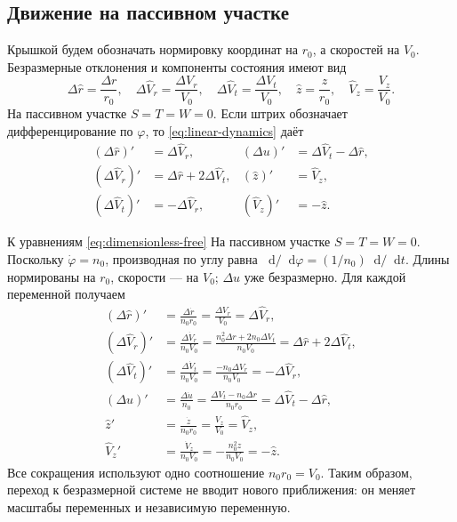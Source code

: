 \documentclass[a4paper,11pt]{article}
\newcommand{\dd}{\mathop{}\!\mathrm d}
\numberwithin{equation}{section}
\theoremstyle{remark}
\begin{document}
\subsection{Движение на пассивном участке}

Крышкой будем обозначать нормировку координат на $r_0$, а скоростей
на $V_0$. Безразмерные отклонения и компоненты состояния имеют вид
\begin {equation}
 \Delta\widehat r=\frac{{\Delta r}}{{r_0}},\quad
 \Delta\widehat V_r=\frac{{\Delta V_r}}{{V_0}},\quad
 \Delta\widehat V_t=\frac{{\Delta V_t}}{{V_0}},\quad
 \widehat z=\frac{{z}}{{r_0}},\quad
 \widehat V_z=\frac{{V_z}}{{V_0}}.
 \label {eq:dimensionless-state}
\end {equation}
На пассивном участке $S=T=W=0$. Если штрих обозначает
дифференцирование по $\varphi$, то \eqref{eq:linear-dynamics} даёт
\begin{equation}
 \begin{aligned}
  (\Delta\widehat r)'&=\Delta\widehat V_r,&
  (\Delta u)'&=\Delta\widehat V_t-\Delta\widehat r,\\
  (\Delta\widehat V_r)'&=\Delta\widehat r+2\Delta\widehat V_t,&
  (\widehat z)'&=\widehat V_z,\\
  (\Delta\widehat V_t)'&=-\Delta\widehat V_r,&
  (\widehat V_z)'&=-\widehat z.
 \end{aligned}
 \label{eq:dimensionless-free}
\end{equation}
\begin{explanation}{К уравнениям \eqref{eq:dimensionless-free}}
На пассивном участке $S=T=W=0$. Поскольку $\dot\varphi=n_0$,
производная по углу равна $\dd/\dd\varphi=(1/n_0)\dd/\dd t$.
Длины нормированы на $r_0$, скорости --- на $V_0$;
$\Delta u$ уже безразмерно. Для каждой переменной получаем
\[
\begin{aligned}
(\Delta\widehat r)'&=\frac{\Delta\dot r}{n_0r_0}
 =\frac{\Delta V_r}{V_0}=\Delta\widehat V_r,\\
(\Delta\widehat V_r)'&=\frac{\Delta\dot V_r}{n_0V_0}
 =\frac{n_0^2\Delta r+2n_0\Delta V_t}{n_0V_0}
 =\Delta\widehat r+2\Delta\widehat V_t,\\
(\Delta\widehat V_t)'&=\frac{\Delta\dot V_t}{n_0V_0}
 =\frac{-n_0\Delta V_r}{n_0V_0}=-\Delta\widehat V_r,\\
(\Delta u)'&=\frac{\Delta\dot u}{n_0}
 =\frac{\Delta V_t-n_0\Delta r}{n_0r_0}
 =\Delta\widehat V_t-\Delta\widehat r,\\
\widehat z'&=\frac{\dot z}{n_0r_0}=\frac{V_z}{V_0}=\widehat V_z,\\
\widehat V_z'&=\frac{\dot V_z}{n_0V_0}
 =-\frac{n_0^2z}{n_0V_0}=-\widehat z.
\end{aligned}
\]
Все сокращения используют одно соотношение $n_0r_0=V_0$.
Таким образом, переход к безразмерной системе не вводит нового
приближения: он меняет масштабы переменных и независимую переменную.
\end{explanation}
\end{document}
